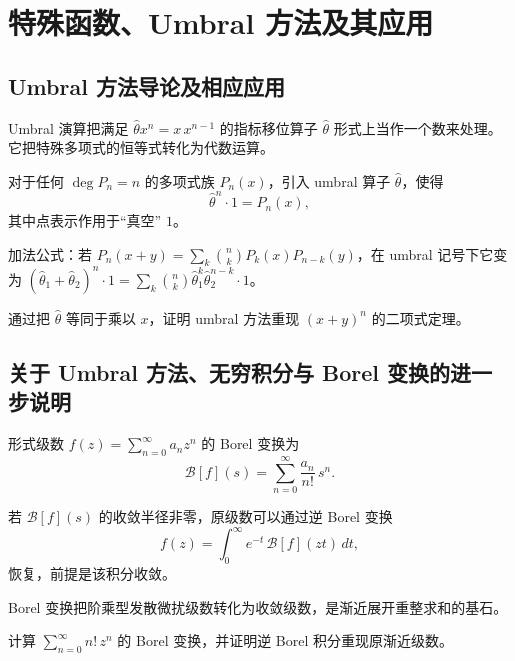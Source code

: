 \chapter{特殊函数、Umbral 方法及其应用}

\section{Umbral 方法导论及相应应用}

Umbral 演算把满足 $\hat\theta x^n = x\,x^{n-1}$ 的指标移位算子 $\hat\theta$ 形式上当作一个数来处理。它把特殊多项式的恒等式转化为代数运算。

对于任何 $\deg P_n=n$ 的多项式族 $P_n(x)$，引入 umbral 算子 $\hat\theta$，使得
\begin{equation}
\hat\theta^n\cdot 1 = P_n(x),
\label{eq:9.1.1}
\end{equation}
其中点表示作用于``真空'' $1$。

加法公式：若 $P_n(x+y)=\sum_k\binom{n}{k}P_k(x)P_{n-k}(y)$，在 umbral 记号下它变为
$(\hat\theta_1+\hat\theta_2)^n\cdot1 = \sum_k\binom{n}{k}\hat\theta_1^k\hat\theta_2^{n-k}\cdot1$。

\begin{exercise}
通过把 $\hat\theta$ 等同于乘以 $x$，证明 umbral 方法重现 $(x+y)^n$ 的二项式定理。
\end{exercise}

\section{关于 Umbral 方法、无穷积分与 Borel 变换的进一步说明}

形式级数
$f(z)=\sum_{n=0}^\infty a_n z^n$ 的 Borel 变换为
\begin{equation}
\mathcal B[f](s) = \sum_{n=0}^\infty \frac{a_n}{n!}\,s^n.
\label{eq:9.2.1}
\end{equation}

若 $\mathcal B[f](s)$ 的收敛半径非零，原级数可以通过逆 Borel 变换
\begin{equation}
f(z) = \int_0^\infty e^{-t}\,\mathcal B[f](zt)\,dt,
\label{eq:9.2.2}
\end{equation}
恢复，前提是该积分收敛。

Borel 变换把阶乘型发散微扰级数转化为收敛级数，是渐近展开重整求和的基石。

\begin{exercise}
计算 $\sum_{n=0}^\infty n!\,z^n$ 的 Borel 变换，并证明逆 Borel 积分重现原渐近级数。
\end{exercise}

